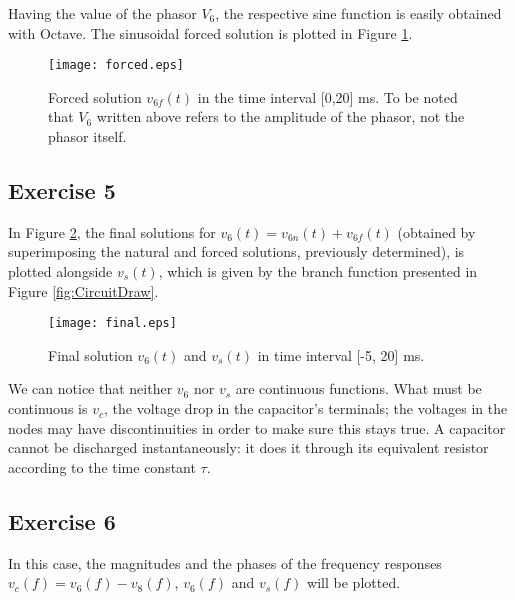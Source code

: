 Having the value of the phasor $V_6$, the respective sine function is easily obtained with Octave. The sinusoidal forced solution is plotted in Figure \ref{fig:ForcedSolutionGraph}.

\begin{figure}[H]
  \centering
  \texttt{[image: forced.eps]}
  \caption{Forced solution $v_{6f}(t)$ in the time interval [0,20] ms. To be noted that $V_6$ written above refers to the amplitude of the phasor, not the phasor itself.}
  \label{fig:ForcedSolutionGraph}
\end{figure}

\subsection{Exercise 5} \label{sec:Ex5Theo}

In Figure \ref{fig:final}, the final solutions for $v_6 (t)=v_{6n}(t)+v_{6f}(t)$ (obtained by superimposing the natural and forced solutions, previously determined), is plotted alongside $v_s(t)$, which is given by the branch function presented in Figure \ref{fig:CircuitDraw}.


\begin{figure}[H] \centering
  \texttt{[image: final.eps]}
  \caption{Final solution $v_6(t)$ and $v_s(t)$ in time interval [-5, 20] ms.}
  \label{fig:final}
\end{figure}

We can notice that neither $v_6$ nor $v_s$ are continuous functions. What must be continuous is $v_c$, the voltage drop in the capacitor's terminals; the voltages in the nodes may have discontinuities in order to make sure this stays true. A capacitor cannot be discharged instantaneously: it does it through its equivalent resistor according to the time constant $\tau$.


\subsection{Exercise 6} \label{sec:Ex6Theo}

In this case, the magnitudes and the phases of the frequency responses $v_c(f)=v_6(f)-v_8(f)$, $v_6(f)$ and $v_s(f)$ will be plotted.

